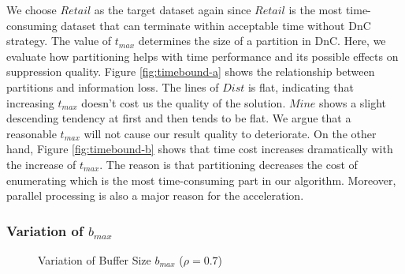 We choose $Retail$ as the target dataset again since $Retail$
is the most time-consuming dataset that can terminate within
acceptable time without DnC strategy.
The value of $t_{max}$ determines the size of a partition in DnC.
Here, we evaluate how partitioning helps with time performance and
its possible effects on suppression quality.
Figure \ref{fig:timebound-a} shows the relationship between partitions
and information loss. The lines of  $Dist$ is flat, indicating that
increasing $t_{max}$ doesn't cost us the quality of the solution. $Mine$
shows a slight descending tendency at first and then tends to be flat.
We argue that a reasonable $t_{max}$ will not cause our result quality to
deteriorate.
On the other hand, Figure \ref{fig:timebound-b} shows that
time cost increases dramatically  with the increase of  $t_{max}$.
The reason is that partitioning decreases the cost of enumerating \qids which
is the most time-consuming part in our algorithm. Moreover, parallel
processing is also a major reason for the acceleration.

\subsubsection{Variation of $b_{max}$}

\begin{figure}[tb]
\centering
{}
\caption{Variation of Buffer Size $b_{max}$ ($\rho=0.7$)}\label{fig:buffersize}
\end{figure}

